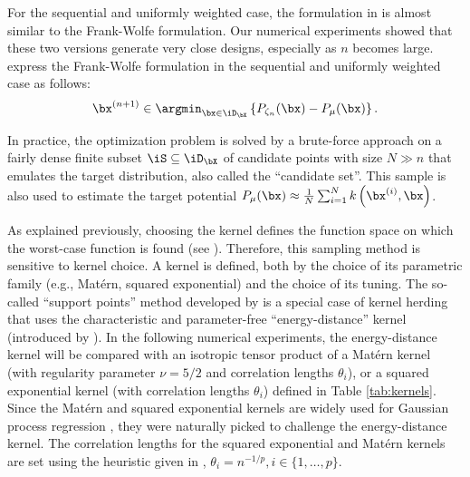 \medskip
\begin{remark}
For the sequential and uniformly weighted case, the formulation in  is almost similar to the Frank-Wolfe formulation. 
Our numerical experiments showed that these two versions generate very close designs, especially as $n$ becomes large. 
\cite{pronzato_rendas_2021} express the Frank-Wolfe formulation in the sequential and uniformly weighted case as follows:
\begin{align}
   \bx^{(n+1)} \in \argmin_{\bx \in \iD_{\bX}} \left\{P_{\zeta_n}(\bx) - P_{\mu}(\bx)\right\}.
   \label{eq:kh_criterion}
\end{align}
\end{remark}
\smallskip

\begin{remark}
In practice, the optimization problem is solved by a brute-force approach on a fairly dense finite subset $\iS\subseteq\iD_{\bX}$ of candidate points with size $N \gg n$ that emulates the target distribution, also called the ``candidate set''. 
This sample is also used to estimate the target potential $P_\mu(\bx) \approx \frac1N \sum_{i=1}^N k\left(\bx^{(i)}, \bx\right)$.
\end{remark}
\medskip

As explained previously, choosing the kernel defines the function space on which the worst-case function is found (see ). 
Therefore, this sampling method is sensitive to kernel choice. 
A kernel is defined, both by the choice of its parametric family (e.g., Matérn, squared exponential) and the choice of its tuning. 
The so-called ``support points'' method developed by \cite{mak_joseph_2018} is a special case of kernel herding that uses the characteristic and parameter-free ``energy-distance'' kernel (introduced by \cite{szekely_rizzo_2013}). 
In the following numerical experiments, the energy-distance kernel will be compared with an isotropic tensor product of a Matérn kernel (with regularity parameter $\nu = 5/2$ and correlation lengths $\theta_i$), or a squared exponential kernel (with correlation lengths $\theta_i$) defined in Table \ref{tab:kernels}. 
Since the Matérn and squared exponential kernels are widely used for Gaussian process regression \citep{rasmussen_2006}, they were naturally picked to challenge the energy-distance kernel. 
The correlation lengths for the squared exponential and Matérn kernels are set using the heuristic given in \cite{fekhari_iooss_2023}, $\theta_i = n^{-1/p}, i \in \{1, \dots, p\}$. 

